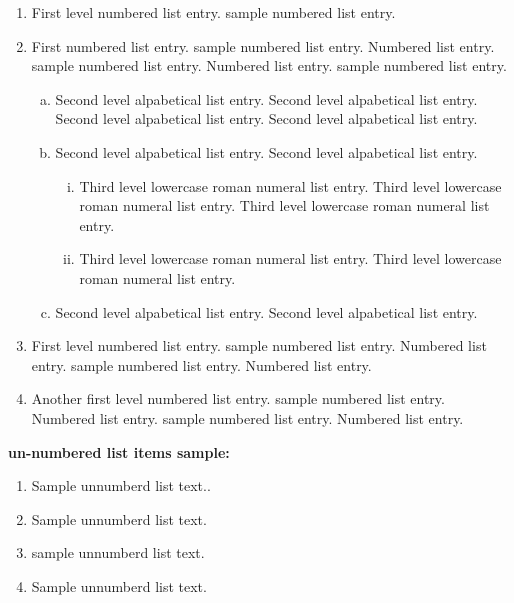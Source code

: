 \documentclass[AMA]{WileyNJD-v1}
\begin{document}
\begin{enumerate}[1.]
\item First level numbered list entry. sample numbered list entry. 

\item First numbered list entry. sample numbered list entry. Numbered list entry.\cite{Caramana-Shashkov-98} sample numbered list entry. Numbered list entry. sample numbered list entry. 

\begin{enumerate}[a.]
\item Second level alpabetical list entry. Second level alpabetical list entry. Second level alpabetical list entry.\cite{Hoch-ALE-HAL-09} Second level alpabetical list entry. 

\item Second level alpabetical list entry. Second level alpabetical list entry.\cites{Shashkov-book-96,Knupp-Winslow_smoothing_2D_unstruct-EwC-99,Knupp-Winslow_smoothing_2D_unstruct-EwC-99}

\begin{enumerate}[ii.]
\item Third level lowercase roman numeral list entry. Third level lowercase roman numeral list entry. Third level lowercase roman numeral list entry. 

\item Third level lowercase roman numeral list entry. Third level lowercase roman numeral list entry.\cite{ka00}
\end{enumerate}

\item Second level alpabetical list entry. Second level alpabetical list entry.\cite{Taylor499}
\end{enumerate}

\item First level numbered list entry. sample numbered list entry. Numbered list entry. sample numbered list entry. Numbered list entry. 

\item Another first level numbered list entry. sample numbered list entry. Numbered list entry. sample numbered list entry. Numbered list entry. 
\end{enumerate}

\noindent\textbf{un-numbered list items sample:}

\begin{enumerate}[]
\item Sample unnumberd list text..
\item Sample unnumberd list text.
\item sample unnumberd list text. 
\item Sample unnumberd list text.
\end{enumerate}
\end{document}
